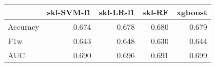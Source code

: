 \begin{tabular}{lrrrr}
\toprule
{} &  skl-SVM-l1 &  skl-LR-l1 &  skl-RF &  xgboost \\
\midrule
Accuracy &       0.674 &      0.678 &   0.680 &    0.679 \\
F1w      &       0.643 &      0.648 &   0.630 &    0.644 \\
AUC      &       0.690 &      0.696 &   0.691 &    0.699 \\
\bottomrule
\end{tabular}
